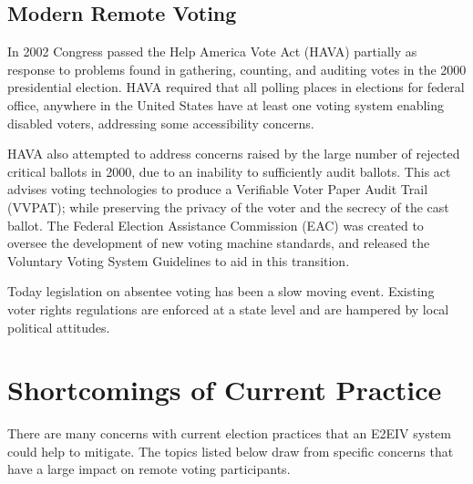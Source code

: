 \subsection{Modern Remote Voting}

In 2002 Congress passed the Help America Vote Act (HAVA) partially as response
to problems found in gathering, counting, and auditing votes in the 2000
presidential election. HAVA required that all polling places in elections for
federal office, anywhere in the United States have at least one voting system
enabling disabled voters, addressing some accessibility concerns.

HAVA also attempted to address concerns raised by the large number of rejected
critical ballots in 2000, due to an inability to sufficiently audit ballots.
This act advises voting technologies to produce a Verifiable Voter Paper Audit
Trail (VVPAT); while preserving the privacy of the voter and the secrecy of the
cast ballot. The Federal Election Assistance Commission (EAC) was created to
oversee the development of new voting machine standards, and released the
Voluntary Voting System Guidelines to aid in this transition.




Today legislation on absentee voting has been a slow moving event. Existing
voter rights regulations are enforced at a state level and are hampered by
local political attitudes.

\section{Shortcomings of Current Practice}

There are many concerns with current election practices that an E2EIV system
could help to mitigate. The topics listed below draw from specific concerns
that have a large impact on remote voting participants.


